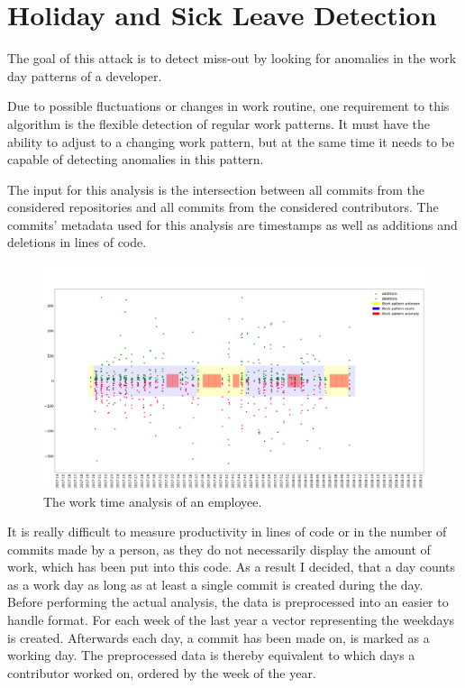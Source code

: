 \section{Holiday and Sick Leave Detection}

The goal of this attack is to detect miss-out by looking for anomalies in the work day patterns of a developer.

Due to possible fluctuations or changes in work routine, one requirement to this algorithm is the flexible detection of regular work patterns.
It must have the ability to adjust to a changing work pattern, but at the same time it needs to be capable of detecting anomalies in this pattern.

The input for this analysis is the intersection between all commits from the considered repositories and all commits from the considered contributors.
The commits' metadata used for this analysis are timestamps as well as additions and deletions in lines of code.

\begin{figure}[H]
    \includegraphics[scale=0.20]{./graphs/analysis/work-time-analysis}
    \centering
    \caption{The work time analysis of an employee.}\label{fig:missing-time}
\end{figure}

It is really difficult to measure productivity in lines of code or in the number of commits made by a person, as they do not necessarily display the amount of work, which has been put into this code.
As a result I decided, that a day counts as a work day as long as at least a single commit is created during the day.
Before performing the actual analysis, the data is preprocessed into an easier to handle format.
For each week of the last year a vector representing the weekdays is created.
Afterwards each day, a commit has been made on, is marked as a working day.
The preprocessed data is thereby equivalent to which days a contributor worked on, ordered by the week of the year.

